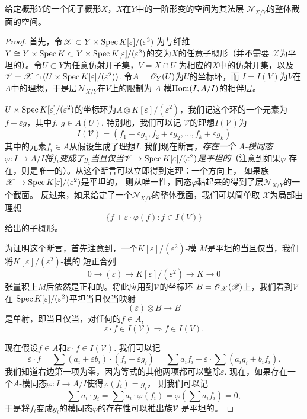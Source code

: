 \begin{thm}\label{thm:6.29}
给定概形$Y$的一个闭子概形$X$，$X$在$Y$中的一阶形变的空间为其法层
$\mathscr N_{X/Y}$的整体截面的空间。
\end{thm}

\begin{proof}
首先，令$\mathscr X\subset Y\times \operatorname{Spec} K[\varepsilon]/(\varepsilon^2)$
为与纤维$Y\cong Y\times \operatorname{Spec} K\subset Y\times 
\operatorname{Spec} K[\varepsilon]/(\varepsilon^2)$的交为$X$的任意子概形（并不需要
$\mathscr X$为平坦的）。令$U\subset Y$为任意仿射开子集，$V=X\cap U$
为相应的$X$中的仿射开集，以及$\mathscr V=\mathscr X\cap (U\times \operatorname{Spec} 
K[\varepsilon]/(\varepsilon^2))$. 令$A=\mathscr{O}_Y(U)$为$U$的坐标环，而
$I=I(V)$为$V$在$A$中的理想，于是层$\mathscr N_{X/Y}$在$V$上的限制为
$A$-模$\operatorname{Hom}(I,A/I)$的相伴层。

$U\times \operatorname{Spec} K[\varepsilon]/(\varepsilon^2)$的坐标环为$A\otimes 
K[\varepsilon]/(\varepsilon^2)$，我们记这个环的一个元素为
$f+\varepsilon g$，其中$f$, $g\in A(U)$. 特别地，我们可以记
$\mathscr V$的理想$I(\mathscr V)$为
\[
    I(\mathscr{V})=\left(f_{1}+\varepsilon g_{1}, 
    f_{2}+\varepsilon g_{2}, \dots, f_{k}+\varepsilon g_{k}\right)
\]
其中的元素$f_i\in A$从假设生成了理想$I$. 我们现在断言，\emph{存在一个
$A$-模同态$\varphi:I\to A/I$将$f_i$变成了$g_i$当且仅当$\mathscr V
\to \operatorname{Spec} K[\varepsilon]/(\varepsilon^2)$是平坦的}（注意到如果$\varphi$
存在，则是唯一的）。从这个断言可以立即得到定理：一个方向上，
如果族$\mathscr X\to \operatorname{Spec} K[\varepsilon]/(\varepsilon^2)$是平坦的，
则从唯一性，同态$\varphi$黏起来的得到了层$\mathscr N_{X/Y}$的一个截面。
反过来，如果给定了一个$\mathscr N_{X/Y}$的整体截面，我们可以简单取
$\mathscr X$为局部由理想
\[
    \{f+\varepsilon \cdot \varphi(f): f \in I(V)\}
\]
给出的子概形。

为证明这个断言，首先注意到，一个$K[\varepsilon]/(\varepsilon^2)$-模
$M$是平坦的当且仅当，我们将$K[\varepsilon]/(\varepsilon^2)$-模的
短正合列
\[
    0 \to (\varepsilon) \to  K[\varepsilon] /(\varepsilon^{2})
    \to  K \to  0
\]
张量积上$M$后依然是正和的。将此应用到$\mathscr V$的坐标环
$B=\mathscr{O}_{\mathscr X}(\mathscr B)$上，我们看到$\mathscr V$在
$\operatorname{Spec} K[\varepsilon]/(\varepsilon^2)$平坦当且仅当映射
\[
    (\varepsilon)\otimes B\to B
\]
是单射，即当且仅当，对任何的$f\in A$,
\[
    \varepsilon \cdot f \in I(\mathscr{V}) \Rightarrow f \in I(V).
\]


现在假设$f\in A$和$\varepsilon\cdot f\in I(\mathscr V)$. 我们可以记
\[
    \varepsilon \cdot f=\sum(a_{i}+\varepsilon b_{i}) 
    \cdot(f_{i}+\varepsilon g_{i})=\sum a_{i} f_{i}+
    \varepsilon \cdot \sum(a_{i} g_{i}+b_{i} f_{i}).
\]
我们知道右边第一项为零，因为等式的其他两项都可以整除$\varepsilon$.
现在，如果存在一个$A$-模同态$\varphi:I\to A/I$使得$\varphi(f_i)=g_i$，
则我们可以记
\[
    \sum a_{i} \cdot g_{i}=\sum a_{i} \cdot \varphi\left(f_{i}\right)=
    \varphi\left(\sum a_{i} f_{i}\right)=0,
\]
于是将$f_i$变成$g_i$的模同态$\varphi$的存在性可以推出族$\mathscr V$
是平坦的。


\end{proof}
